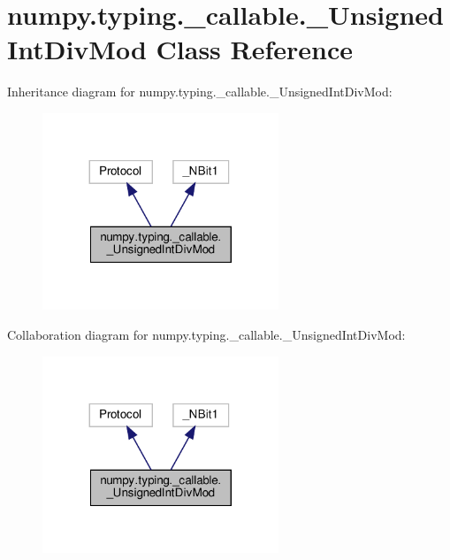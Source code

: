 \hypertarget{classnumpy_1_1typing_1_1__callable_1_1__UnsignedIntDivMod}{}\section{numpy.\+typing.\+\_\+callable.\+\_\+\+Unsigned\+Int\+Div\+Mod Class Reference}
\label{classnumpy_1_1typing_1_1__callable_1_1__UnsignedIntDivMod}


Inheritance diagram for numpy.\+typing.\+\_\+callable.\+\_\+\+Unsigned\+Int\+Div\+Mod\+:
\nopagebreak
\begin{figure}[H]
\begin{center}
\leavevmode
\includegraphics[width=200pt]{classnumpy_1_1typing_1_1__callable_1_1__UnsignedIntDivMod__inherit__graph}
\end{center}
\end{figure}


Collaboration diagram for numpy.\+typing.\+\_\+callable.\+\_\+\+Unsigned\+Int\+Div\+Mod\+:
\nopagebreak
\begin{figure}[H]
\begin{center}
\leavevmode
\includegraphics[width=200pt]{classnumpy_1_1typing_1_1__callable_1_1__UnsignedIntDivMod__coll__graph}
\end{center}
\end{figure}
